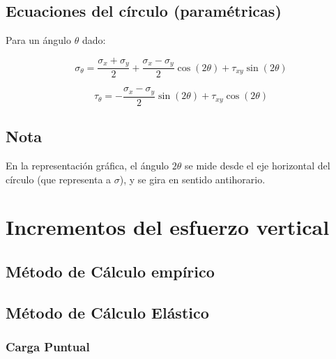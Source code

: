 \documentclass{article} %
\begin{document}
\subsection*{Ecuaciones del círculo (paramétricas)}

Para un ángulo $\theta$ dado:

\[
\sigma_\theta = \frac{\sigma_x + \sigma_y}{2} + \frac{\sigma_x - \sigma_y}{2} \cos(2\theta) + \tau_{xy} \sin(2\theta)
\]

\[
\tau_\theta = -\frac{\sigma_x - \sigma_y}{2} \sin(2\theta) + \tau_{xy} \cos(2\theta)
\]

\subsection*{Nota}

En la representación gráfica, el ángulo $2\theta$ se mide desde el eje horizontal del círculo (que representa a $\sigma$), y se gira en sentido antihorario.

\newpage
\section{Incrementos del esfuerzo vertical}

\subsection*{Método de Cálculo empírico}



\subsection*{Método de Cálculo Elástico}
\subsubsection*{Carga Puntual}
\end{document}
